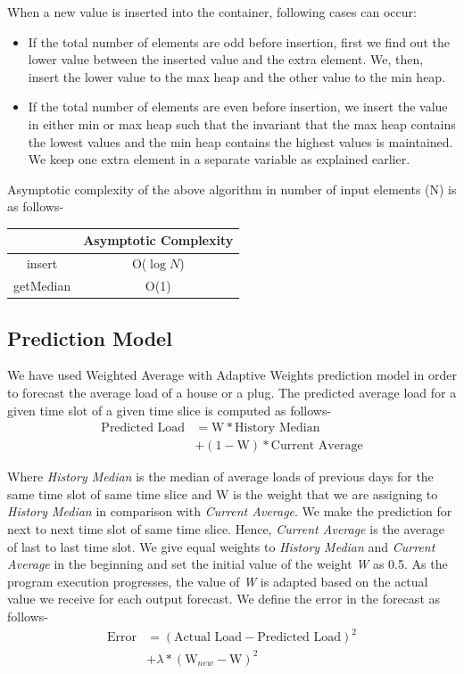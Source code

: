 \noindent When a new value is inserted into the container, following cases can occur:
\begin{itemize}
\item If the total number of elements are odd before insertion, first we find out the lower value between the inserted value and the extra element. We, then, insert the lower value to the max heap and the other value to the min heap.
\item If the total number of elements are even before insertion, we insert the value in either min or max heap such that the invariant that the max heap contains the lowest values and the min heap contains the highest values is maintained. We keep one extra element in a separate variable as explained earlier.
\end{itemize}

\noindent Asymptotic complexity of the above algorithm in number of input elements (N) is as follows-

\begin{table}[h]
\begin{center}
\begin{tabular}{|c|c|}
\hline 
& Asymptotic Complexity \\ 
\hline 
insert & O($\log N$) \\ 
\hline 
getMedian & O(1) \\ 
\hline 
\end{tabular}
\end{center}
\end{table}

\vspace*{-0.5cm}
\subsection{Prediction Model}
We have used Weighted Average with Adaptive Weights prediction model in order to forecast the average load of a house or a plug. The predicted average load for a given time slot of a given time slice is computed as follows-
\begin{align*}
\mbox{Predicted Load} &= \mbox{W}*\mbox{History Median} \\ &+ (1-\mbox{W})*\mbox{Current Average}
\end{align*}

\noindent Where \textit{History Median} is the median of average loads of previous days for the same time slot of same time slice and W is the weight that we are assigning to \textit{History Median} in comparison with \textit{Current Average}. We make the prediction for next to next time slot of same time slice. Hence, \textit{Current Average} is the average of last to last time slot. We give equal weights to \textit{History Median} and \textit{Current Average} in the beginning and set the initial value of the weight \textit{W} as 0.5. As the program execution progresses, the value of \textit{W} is adapted based on the actual value we receive for each output forecast. We define the error in the forecast as follows-
\begin{align*}
\mbox{Error} &= (\mbox{Actual Load} - \mbox{Predicted Load})^2\\ &+ \lambda * (\mbox{W}_{new} - \mbox{W})^2
\end{align*}

